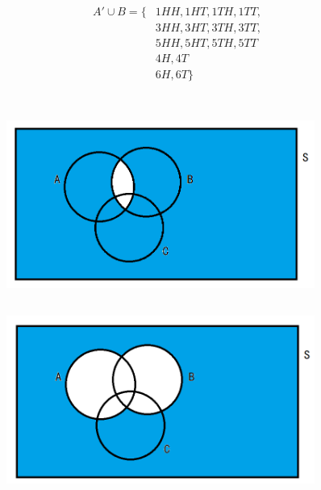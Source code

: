 \documentclass{article}
\begin{document}
            \paragraph{
                \begin{equation*}
                    \begin{split}
                        A'\cup B =\{&1HH,1HT,1TH,1TT,\\
                            &3HH,3HT,3TH,3TT,\\
                            &5HH,5HT,5TH,5TT\\
                            &4H,4T\\
                            &6H,6T\}\\
                    \end{split}
                \end{equation*}
            }
    \section{}
        \subsection{}
            \begin{figure}[H]
                \centering
                \includegraphics[width=0.9\textwidth]{img/Assignment1-01.png}
            \end{figure}
        \subsection{}
            \begin{figure}[H]
                \centering
                \includegraphics[width=0.9\textwidth]{img/Assignment1-02.png}
            \end{figure}
\end{document}
